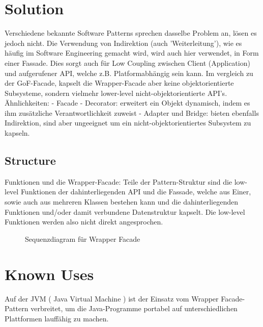 \section{Solution}
Verschiedene bekannte Software Patterns sprechen dasselbe Problem an, lösen es jedoch nicht. Die Verwendung von Indirektion (auch 'Weiterleitung'), wie es häufig im Software Engineering gemacht wird, wird auch hier verwendet, in Form einer Fassade. Dies sorgt auch für Low Coupling zwischen Client (Application) und aufgerufener API, welche z.B. Platformabhängig sein kann. Im vergleich zu der GoF-Facade, kapselt die Wrapper-Facade aber keine objektorientierte Subsysteme, sondern vielmehr lower-level nicht-objektorientierte API's. Ähnlichkeiten: - Facade - Decorator: erweitert ein Objekt dynamisch, indem es ihm zusätzliche Verantwortlichkeit zuweist - Adapter und Bridge: bieten ebenfalls Indirektion, sind aber ungeeignet um ein nicht-objektorientiertes Subsystem zu kapseln.

\subsection{Structure}
Funktionen und die Wrapper-Facade: Teile der Pattern-Struktur sind die low-level Funktionen der dahinterliegenden API und die Fassade, welche aus Einer, sowie auch aus mehreren Klassen bestehen kann und die dahinterliegenden Funktionen und/oder damit verbundene Datenstruktur kapselt. Die low-level Funktionen werden also nicht direkt angesprochen.

\begin{figure}[H]
  \centering
  
  \caption{Sequenzdiagram f\"ur Wrapper Facade}
\end{figure}

\section{Known Uses}
Auf der JVM ( Java Virtual Machine ) ist der Einsatz vom Wrapper Facade-Pattern verbreitet, um die Java-Programme portabel auf unterschiedlichen Plattformen lauffähig zu machen.

